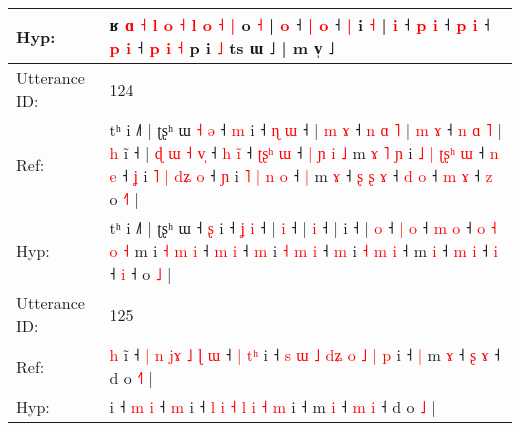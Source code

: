 \documentclass[10pt]{article}
\DeclareRobustCommand{\hl}[1]{{\textcolor{red}{#1}}}
\begin{document}
\begin{longtable}{ll}
 \\
Hyp: & \hl{}\hl{}\hl{}\hl{}\hl{}ʁ\hl{}\hl{}\hl{}\hl{}\hl{}\hl{}\hl{}\hl{}\hl{}\hl{}\hl{}\hl{}\hl{}\hl{} \hl{ɑ} \hl{˧} \hl{l} \hl{o} \hl{˧} \hl{l} \hl{}\hl{o} \hl{˧} \hl{|} o \hl{˧} |\hl{}\hl{}\hl{}\hl{} \hl{o} ˧ \hl{|} \hl{o} ˧ \hl{|} i \hl{˧} |\hl{}\hl{} \hl{i} ˧ \hl{}\hl{p} \hl{i} ˧\hl{}\hl{}\hl{}\hl{}\hl{}\hl{}\hl{}\hl{} \hl{p} \hl{}\hl{i} ˧ \hl{}\hl{p} \hl{i} ˧\hl{}\hl{}\hl{}\hl{}\hl{}\hl{} \hl{p} \hl{i} \hl{˧} p i \hl{˩} ts ɯ ˩ | m v̩ ˩
 \\
\midrule
Utterance ID: & 124 \\
Ref: & tʰ i ˩˥ | ʈʂʰ ɯ\hl{ }\hl{˧}\hl{ }\hl{ə} ˧ \hl{m} i ˧ \hl{ɳ} \hl{ɯ} ˧ |\hl{ }\hl{m} \hl{ɤ} ˧\hl{ }\hl{n}\hl{ }\hl{ɑ}\hl{ }\hl{˥} |\hl{ }\hl{m} \hl{ɤ} ˧\hl{ }\hl{n}\hl{ }\hl{ɑ}\hl{ }\hl{˥} |\hl{ }\hl{h} i\hl{̃} ˧ |\hl{ }\hl{ɖ}\hl{ }\hl{ɯ}\hl{ }\hl{˧} \hl{v}\hl{̩} ˧ \hl{h} \hl{i}\hl{̃} ˧ \hl{ʈ}\hl{ʂ}\hl{ʰ} \hl{ɯ} ˧ \hl{|} \hl{ɲ} \hl{i} \hl{˩} m\hl{ }\hl{ɤ}\hl{ }\hl{˥}\hl{ }\hl{ɲ} i\hl{ }\hl{˩} \hl{|} \hl{ʈ}\hl{ʂ}\hl{ʰ} \hl{ɯ} ˧ \hl{n} \hl{e} ˧ \hl{ʝ} i\hl{ }\hl{˥} \hl{|} \hl{d}\hl{ʑ} \hl{o} ˧ \hl{ɲ} i\hl{ }\hl{˥} \hl{|} \hl{n} \hl{o} ˧\hl{ }\hl{|} m \hl{ɤ} ˧\hl{ }\hl{ʂ} \hl{ʂ} \hl{ɤ} ˧\hl{ }\hl{d} \hl{o} ˧\hl{ }\hl{m} \hl{ɤ} ˧\hl{ }\hl{z} o \hl{˧}\hl{˥} |
 \\
Hyp: & tʰ i ˩˥ | ʈʂʰ ɯ\hl{}\hl{}\hl{}\hl{} ˧ \hl{ʂ} i ˧ \hl{ʝ} \hl{i} ˧ |\hl{}\hl{} \hl{i} ˧\hl{}\hl{}\hl{}\hl{}\hl{}\hl{} |\hl{}\hl{} \hl{i} ˧\hl{}\hl{}\hl{}\hl{}\hl{}\hl{} |\hl{}\hl{} i\hl{} ˧ |\hl{}\hl{}\hl{}\hl{}\hl{}\hl{} \hl{}\hl{o} ˧ \hl{|} \hl{}\hl{o} ˧ \hl{}\hl{}\hl{m} \hl{o} ˧ \hl{o} \hl{˧} \hl{o} \hl{˧} m\hl{}\hl{}\hl{}\hl{}\hl{}\hl{} i\hl{}\hl{} \hl{˧} \hl{}\hl{}\hl{m} \hl{i} ˧ \hl{m} \hl{i} ˧ \hl{m} i\hl{}\hl{} \hl{˧} \hl{}\hl{m} \hl{i} ˧ \hl{m} i\hl{}\hl{} \hl{˧} \hl{m} \hl{i} ˧\hl{}\hl{} m \hl{i} ˧\hl{}\hl{} \hl{m} \hl{i} ˧\hl{}\hl{} \hl{i} ˧\hl{}\hl{} \hl{i} ˧\hl{}\hl{} o \hl{}\hl{˩} |
 \\
\midrule
Utterance ID: & 125 \\
Ref: & \hl{h}\hl{ }i\hl{̃} ˧\hl{ }\hl{|}\hl{ }\hl{n}\hl{ }\hl{j}\hl{ɤ}\hl{ }\hl{˩} \hl{ɭ} \hl{ɯ} ˧\hl{ }\hl{|} \hl{t}\hl{ʰ} i ˧\hl{ }\hl{s} \hl{ɯ} \hl{˩} \hl{d}\hl{ʑ} \hl{o} \hl{˩} \hl{|} \hl{p} i ˧\hl{ }\hl{|} m \hl{ɤ} ˧ \hl{ʂ} \hl{ɤ} ˧ d o \hl{˧}\hl{˥} |
 \\
Hyp: & \hl{}\hl{}i\hl{} ˧\hl{}\hl{}\hl{}\hl{}\hl{}\hl{}\hl{}\hl{}\hl{} \hl{m} \hl{i} ˧\hl{}\hl{} \hl{}\hl{m} i ˧\hl{}\hl{} \hl{l} \hl{i} \hl{}\hl{˧} \hl{l} \hl{i} \hl{˧} \hl{m} i ˧\hl{}\hl{} m \hl{i} ˧ \hl{m} \hl{i} ˧ d o \hl{}\hl{˩} |
 \\

\end{longtable}
\end{document}
